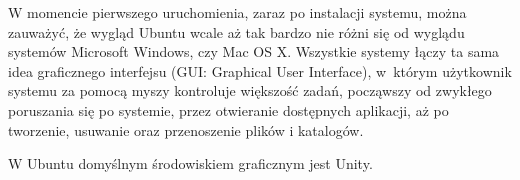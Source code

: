 W momencie pierwszego uruchomienia, zaraz po instalacji systemu, można zauważyć, że wygląd Ubuntu wcale aż tak bardzo nie różni się od wyglądu systemów Microsoft Windows, czy Mac OS X. Wszystkie systemy łączy ta sama idea graficznego interfejsu (\textcolor{ubuntu_orange}{GUI: Graphical User Interface}), w~którym użytkownik systemu za pomocą myszy kontroluje większość zadań, począwszy od zwykłego poruszania się po systemie, przez otwieranie dostępnych aplikacji, aż po tworzenie, usuwanie oraz przenoszenie plików i katalogów.

W Ubuntu domyślnym środowiskiem graficznym jest Unity.
